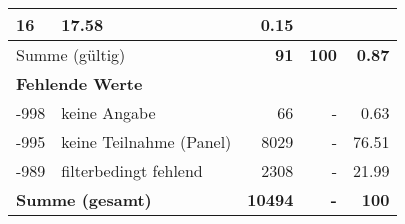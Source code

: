 \begin{longtable}{lXrrr}
       \num{16} &
       \num[round-mode=places,round-precision=2]{17,58} &
         \num[round-mode=places,round-precision=2]{0,15} \\
     \midrule
     \multicolumn{2}{l}{Summe (gültig)} &
       \textbf{\num{91}} &
     \textbf{100} &
       \textbf{\num[round-mode=places,round-precision=2]{0,87}} \\
     \multicolumn{5}{l}{\textbf{Fehlende Werte}}\\
       -998 &
       keine Angabe &
         \num{66} &
        - &
         \num[round-mode=places,round-precision=2]{0,63} \\
       -995 &
       keine Teilnahme (Panel) &
         \num{8029} &
        - &
         \num[round-mode=places,round-precision=2]{76,51} \\
       -989 &
       filterbedingt fehlend &
         \num{2308} &
        - &
         \num[round-mode=places,round-precision=2]{21,99} \\
     \midrule
     \multicolumn{2}{l}{\textbf{Summe (gesamt)}} &
          \textbf{\num{10494}} &
        \textbf{-} &
        \textbf{100} \\
     \bottomrule
     \end{longtable}
     

